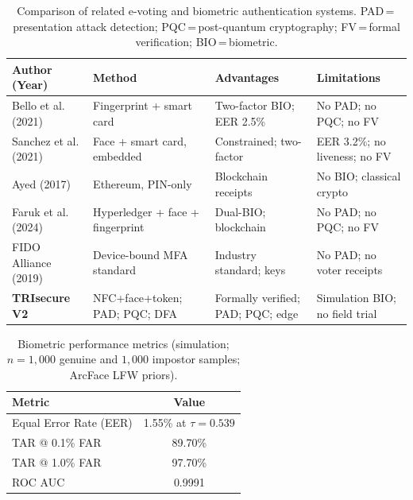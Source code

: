 \documentclass[a4paper,12pt]{article}
\newcommand{\botrule}{\bottomrule}
\begin{document}
\begin{table}[htbp]
\caption{Comparison of related e-voting and biometric authentication
  systems. PAD\,=\,presentation attack detection;
  PQC\,=\,post-quantum cryptography; FV\,=\,formal verification;
  BIO\,=\,biometric.}
\label{tab:related_comparison}
\small
\begin{tabular}{p{2.5cm}p{3.0cm}p{3.9cm}p{3.1cm}}
  \toprule
  \textbf{Author (Year)} & \textbf{Method} &
  \textbf{Advantages} & \textbf{Limitations} \\
  \midrule
  Bello et al. (2021)
    & Fingerprint + smart card
    & Two-factor BIO; EER 2.5\%
    & No PAD; no PQC; no FV \\[2pt]
  Sanchez et al. (2021)
    & Face + smart card, embedded
    & Constrained; two-factor
    & EER 3.2\%; no liveness; no FV \\[2pt]
  Ayed (2017)
    & Ethereum, PIN-only
    & Blockchain receipts
    & No BIO; classical crypto \\[2pt]
  Faruk et al. (2024)
    & Hyperledger + face + fingerprint
    & Dual-BIO; blockchain
    & No PAD; no PQC; no FV \\[2pt]
  FIDO Alliance (2019)
    & Device-bound MFA standard
    & Industry standard; keys
    & No PAD; no voter receipts \\[2pt]
  \textbf{TRIsecure V2}
    & NFC+face+token; PAD; PQC; DFA
    & Formally verified; PAD; PQC; edge
    & Simulation BIO; no field trial \\
  \botrule
\end{tabular}
\end{table}

\bigskip

\begin{table}[htbp]
\caption{Biometric performance metrics (simulation; $n{=}1{,}000$
  genuine and $1{,}000$ impostor samples; ArcFace LFW priors).}
\label{tab:biometric}
\begin{tabular}{lc}
  \toprule
  \textbf{Metric} & \textbf{Value} \\
  \midrule
  Equal Error Rate (EER)  & 1.55\% at $\tau = 0.539$ \\
  TAR @ 0.1\% FAR         & 89.70\%                   \\
  TAR @ 1.0\% FAR         & 97.70\%                   \\
  ROC AUC                 & 0.9991                    \\
  \botrule
\end{tabular}
\end{table}
\end{document}
